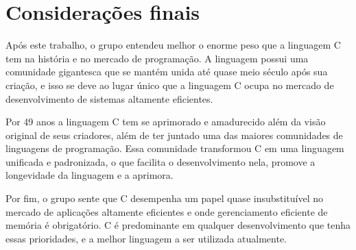 \chapter*[Considerações finais]{Considerações finais}


Após este trabalho, o grupo entendeu melhor o enorme peso que a linguagem C tem na história e 
no mercado de programação. A linguagem possui uma comunidade gigantesca que se mantém unida até
quase meio século após sua criação, e isso se deve ao lugar único que a linguagem C ocupa no mercado 
de desenvolvimento de sistemas altamente eficientes. 

Por 49 anos a linguagem C tem se aprimorado e amadurecido além da visão original de seus criadores, 
além de ter juntado uma das maiores comunidades de linguagens de programação. Essa comunidade transformou 
C em uma linguagem unificada e padronizada, o que facilita o desenvolvimento nela, promove a longevidade da linguagem e a aprimora.

Por fim, o grupo sente que C desempenha um papel quase insubstituível no mercado de aplicações altamente 
eficientes e onde gerenciamento eficiente de memória é obrigatório. C é predominante em qualquer desenvolvimento 
que tenha essas prioridades, e a melhor linguagem a ser utilizada atualmente. 



    \newpage